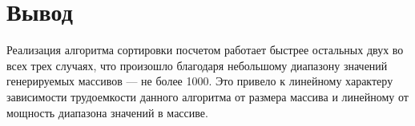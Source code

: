 \section*{Вывод}

Реализация алгоритма сортировки посчетом работает быстрее остальных двух во всех трех случаях, что произошло благодаря небольшому диапазону значений генерируемых массивов --- не более 1000. Это привело к линейному характеру зависимости трудоемкости данного алгоритма от размера массива и линейному от мощность диапазона значений в массиве.


